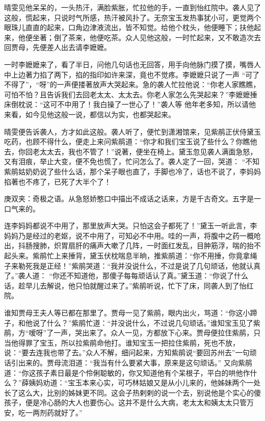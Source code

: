 \begin{parag}
    晴雯见他呆呆的，一头热汗，满脸紫胀，忙拉他的手，一直到怡红院中。袭人见了这般，慌起来，只说时气所感，热汗被风扑了。无奈宝玉发热事犹小可，更觉两个眼珠儿直直的起来，口角边津液流出，皆不知觉。给他个枕头，他便睡下；扶他起来，他便坐著；倒了茶来，他便吃茶。众人见他这般，一时忙起来，又不敢造次去回贾母，先便差人出去请李嬷嬷。
\end{parag}


\begin{parag}
    一时李嬷嬷来了，看了半日，问他几句话也无回答，用手向他脉门摸了摸，嘴唇人中上边著力掐了两下，掐的指印如许来深，竟也不觉疼。李嬷嬷只说了一声 “可了不得了”，“呀”的一声便搂著放声大哭起来。急的袭人忙拉他说：“你老人家瞧瞧，可怕不怕？且告诉我们去回老太太、太太去。你老人家怎么先哭起来？”李嬷嬷捶床倒枕说：“这可不中用了！我白操了一世心了！”袭人等 他年老多知，所以请他来看，如今见他这般一说，都信以为实，也都哭起来。
\end{parag}


\begin{parag}
    晴雯便告诉袭人，方才如此这般。袭人听了，便忙到潇湘馆来，见紫鹃正伏侍黛玉吃药，也顾不得什么，便走上来问紫鹃道：“你才和我们宝玉说了些什么？你瞧他去，你回老太太去，我也不管了！”说著，便坐在椅上。黛玉忽见袭人满面急怒，又有泪痕，举止大变，便不免也慌了，忙问怎么了。袭人定了一回，哭道： “不知紫鹃姑奶奶说了些什么话，那个呆子眼也直了，手脚也冷了，话也不说了，李妈妈掐著也不疼了，已死了大半个了！\begin{note}庚双夹：奇极之语。从急怒娇憨口中描出不成话之话来，方是千古奇文。五字是一口气来的。\end{note}连李妈妈都说不中用了，那里放声大哭。只怕这会子都死了！”黛玉一听此言，李妈妈乃是经过的老妪，说不中用了，可知必不中用。哇的一声，将腹中之药一概呛出，抖肠搜肺，炽胃扇肝的痛声大嗽了几阵，一时面红发乱，目肿筋浮，喘的抬不起头来。紫鹃忙上来捶背，黛玉伏枕喘息半晌，推紫鹃道：“你不用捶，你竟拿绳子来勒死我是正经！”紫鹃哭道：“我并没说什么，不过是说了几句顽话，他就认真了。”袭人道： “你还不知道他，那傻子每每顽话认了真。”黛玉道：“你说了什么话，趁早儿去解说，他只怕就醒过来了。”紫鹃听说，忙下了床，同袭人到了怡红院。
\end{parag}


\begin{parag}
    谁知贾母王夫人等已都在那里了。贾母一见了紫鹃，眼内出火，骂道：“你这小蹄子，和他说了什么？”紫鹃忙道：“并没说什么，不过说几句顽话。”谁知宝玉见了紫鹃，方“嗳呀”了一声，哭出来了。众人一见，方都放下心来。贾母便拉住紫鹃，只当他得罪了宝玉，所以拉紫鹃命他打。谁知宝玉一把拉住紫鹃，死也不放，说：“要去连我也带了去。”众人不解，细问起来，方知紫鹃说“要回苏州去”一句顽话引出来的。贾母流泪道：“我当有什么要紧大事，原来是这句顽话。” 又向紫鹃道：“你这孩子素日最是个伶俐聪敏的，你又知道他有个呆根子，平白的哄他作什么？”薛姨妈劝道：“宝玉本来心实，可巧林姑娘又是从小儿来的，他姊妹两个一处长了这么大，比别的姊妹更不同。这会子热剌剌的说一个去，别说他是个实心的傻孩子，便是冷心肠的大人也要伤心。这并不是什么大病，老太太和姨太太只管万安，吃一两剂药就好了。”
\end{parag}


